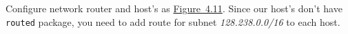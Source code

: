 \documentclass{../UTNetLab}
\begin{document}
    
    Configure network router and host’s as \hyperref[fig:4.11]{Figure~4.11}.
    Since our host’s don’t have \lstinline{routed} package, you need to add route for subnet \textit{128.238.0.0/16} to each host.
\end{document}
